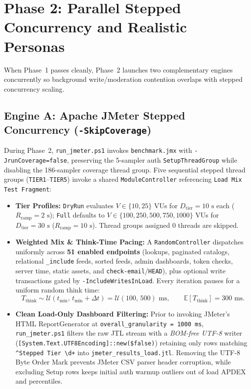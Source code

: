 \documentclass[11pt,letterpaper]{article}
\begin{document}
\section{Phase 2: Parallel Stepped Concurrency and Realistic Personas}

When Phase~1 passes cleanly, Phase~2 launches two complementary engines concurrently so background write/moderation contention overlaps with stepped concurrency scaling.

\subsection{Engine A: Apache JMeter Stepped Concurrency (\texttt{-SkipCoverage})}
During Phase~2, \texttt{run\_jmeter.ps1} invokes \texttt{benchmark.jmx} with \texttt{-JrunCoverage=false}, preserving the 5-sampler auth \texttt{SetupThreadGroup} while disabling the 186-sampler coverage thread group. Five sequential stepped thread groups (\texttt{TIER1}--\texttt{TIER5}) invoke a shared \texttt{ModuleController} referencing \texttt{Load Mix Test Fragment}:
\begin{itemize}
  \item \textbf{Tier Profiles:} \texttt{DryRun} evaluates $V \in \{10, 25\}$ VUs for $D_{\text{tier}} = 10\text{ s}$ each ($R_{\text{ramp}} = 2\text{ s}$); \texttt{Full} defaults to $V \in \{100, 250, 500, 750, 1000\}$ VUs for $D_{\text{tier}} = 30\text{ s}$ ($R_{\text{ramp}} = 10\text{ s}$). Thread groups assigned $0$ threads are skipped.
  \item \textbf{Weighted Mix \& Think-Time Pacing:} A \texttt{RandomController} dispatches uniformly across \textbf{51 enabled endpoints} (lookups, paginated catalogs, relational \texttt{\_include} feeds, sorted feeds, admin dashboards, token checks, server time, static assets, and \texttt{check-email}/\texttt{HEAD}), plus optional write transactions gated by \texttt{-IncludeWritesInLoad}. Every iteration pauses for a uniform random think time:
  \begin{equation}
    \label{eq:think}
    T_{\text{think}} \sim \mathcal{U}(t_{\min},\, t_{\min} + \Delta t) = \mathcal{U}(100,\, 500)\text{ ms}, \qquad \mathbb{E}[T_{\text{think}}] = 300\text{ ms}.
  \end{equation}
  \item \textbf{Clean Load-Only Dashboard Filtering:} Prior to invoking JMeter's HTML ReportGenerator at \texttt{overall\_granularity = 1000 ms}, \texttt{run\_jmeter.ps1} filters the raw JTL stream with a \emph{BOM-free UTF-8} writer (\texttt{[System.Text.UTF8Encoding]::new(\$false)}) retaining only rows matching \texttt{\^{}Stepped Tier \textbackslash d+} into \texttt{jmeter\_results\_load.jtl}. Removing the UTF-8 Byte Order Mark prevents JMeter CSV parser header corruption, while excluding Setup rows keeps initial auth warmup outliers out of load APDEX and percentiles.
\end{itemize}
\end{document}
